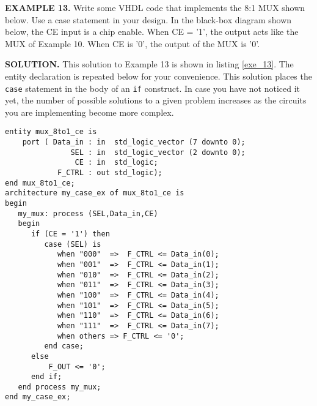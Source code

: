\begin{leftbar}
\begin{minipage}{0.5\linewidth}
\noindent
\textbf{EXAMPLE 13.}
Write some VHDL code that implements the 8:1 MUX shown below. Use a case statement in your design. In the black-box diagram shown below, the CE input is a chip enable. When CE = '1', the output acts like the MUX of Example 10. When CE is '0', the output of the MUX is '0'.
\end{minipage}
\begin{minipage}{0.47\linewidth}
\begin{flushright}
\end{flushright}
\end{minipage}
\end{leftbar}
\noindent
\textbf{SOLUTION.} This solution to Example 13 is shown in listing \ref{exe_13}. The entity declaration is repeated below for your convenience. This solution places the \texttt{case} statement in the body of an \texttt{if} construct. In case you have not noticed it yet, the number of possible solutions to a given problem increases as the circuits you are implementing become more complex.
\null\newpage
\begin{lstlisting}[label=exe_13, caption=Solution to Example 13.]
entity mux_8to1_ce is
    port ( Data_in : in  std_logic_vector (7 downto 0);
               SEL : in  std_logic_vector (2 downto 0);
                CE : in  std_logic;
            F_CTRL : out std_logic);  
end mux_8to1_ce;
architecture my_case_ex of mux_8to1_ce is 
begin
   my_mux: process (SEL,Data_in,CE)
   begin
      if (CE = '1') then 
         case (SEL) is 
            when "000"  =>  F_CTRL <= Data_in(0); 
            when "001"  =>  F_CTRL <= Data_in(1); 
            when "010"  =>  F_CTRL <= Data_in(2); 
            when "011"  =>  F_CTRL <= Data_in(3); 
            when "100"  =>  F_CTRL <= Data_in(4); 
            when "101"  =>  F_CTRL <= Data_in(5); 
            when "110"  =>  F_CTRL <= Data_in(6); 
            when "111"  =>  F_CTRL <= Data_in(7); 
            when others => F_CTRL <= '0'; 
         end case; 
      else
          F_OUT <= '0'; 
      end if; 
   end process my_mux; 
end my_case_ex;
\end{lstlisting}

